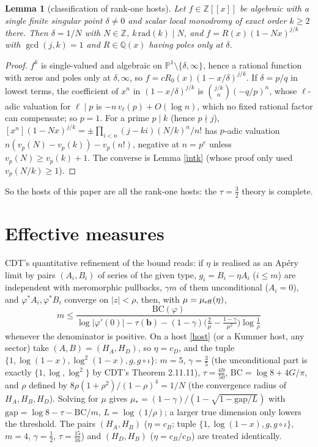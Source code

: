 \documentclass[11pt]{amsart}
\newtheorem{lemma}[theorem]{Lemma}
\theoremstyle{remark}
\newcommand{\Q}{\mathbb Q}\newcommand{\Z}{\mathbb Z}\newcommand{\R}{\mathbb R}\newcommand{\C}{\mathbb C}
\newcommand{\PP}{\mathbb P}\newcommand{\D}{\mathbb D}\newcommand{\T}{\mathbb T}\newcommand{\Cl}{\mathrm{Cl}_2}\newcommand{\Li}{\mathrm{Li}_2}
\begin{document}
\begin{lemma}[classification of rank-one hosts]\label{class}
Let $f\in\Z[[x]]$ be algebraic with a single finite singular point $\delta\ne0$ and scalar local monodromy of exact order $k\ge2$ there. Then $\delta=1/N$ with $N\in\Z$, $k\,\mathrm{rad}(k)\mid N$, and $f=R(x)(1-Nx)^{j/k}$ with $\gcd(j,k)=1$ and $R\in\Q(x)$ having poles only at $\delta$.
\end{lemma}
\begin{proof}
$f^k$ is single-valued and algebraic on $\PP^1\setminus\{\delta,\infty\}$, hence a rational function with zeros and poles only at $\delta,\infty$, so $f=cR_0(x)(1-x/\delta)^{j/k}$. If $\delta=p/q$ in lowest terms, the coefficient of $x^n$ in $(1-x/\delta)^{j/k}$ is $\binom{j/k}n(-q/p)^n$, whose $\ell$-adic valuation for $\ell\mid p$ is $-n\,v_\ell(p)+O(\log n)$, which no fixed rational factor can compensate; so $p=1$. For a prime $p\mid k$ (hence $p\nmid j$), $[x^n](1-Nx)^{j/k}=\pm\prod_{i<n}(j-ki)(N/k)^n/n!$ has $p$-adic valuation $n(v_p(N)-v_p(k))-v_p(n!)$, negative at $n=p^e$ unless $v_p(N)\ge v_p(k)+1$. The converse is Lemma \ref{intk} (whose proof only used $v_p(N/k)\ge1$).
\end{proof}

So the hosts of this paper are all the rank-one hosts: the $\tau=\frac32$ theory is complete.

\section{Effective measures}
CDT's quantitative refinement of the bound \cite[Proposition \texttt{theomainreprise}]{ICM} reads: if $\eta$ is realised as an Ap\'ery limit by pairs $(A_i,B_i)$ of series of the given type, $g_i=B_i-\eta A_i$ ($i\le m$) are independent with meromorphic pullbacks, $\gamma m$ of them unconditional ($A_i=0$), and $\varphi^*A_i,\varphi^*B_i$ converge on $|z|<\rho$, then, with $\mu=\mu_{\rm eff}(\eta)$,
\[
m\le\frac{\mathrm{BC}(\varphi)}{\log|\varphi'(0)|-\tau(\mathbf b)-(1-\gamma)\bigl(\tfrac2\mu-\tfrac{1-\gamma}{\mu^2}\bigr)\log\tfrac1\rho}
\]
whenever the denominator is positive. On a host \eqref{host} (or a Kummer host, any sector) take $(A,B)=(H_A,H_D)$, so $\eta=c_D$, and the tuple $\{1,\log(1-x),\log^2(1-x),g,g\circ\iota\}$: $m=5$, $\gamma=\frac35$ (the unconditional part is exactly $\{1,\log,\log^2\}$ by CDT's Theorem 2.11.11), $\tau=\frac{69}{50}$, $\mathrm{BC}=\log8+4G/\pi$, and $\rho$ defined by $8\rho(1+\rho^2)/(1-\rho)^4=1/N$ (the convergence radius of $H_A,H_B,H_D$). Solving for $\mu$ gives $\mu_*=(1-\gamma)/(1-\sqrt{1-\mathrm{gap}/L})$ with $\mathrm{gap}=\log8-\tau-\mathrm{BC}/m$, $L=\log(1/\rho)$; a larger true dimension only lowers the threshold. The pairs $(H_A,H_B)$ ($\eta=c_B$; tuple $\{1,\log(1-x),g,g\circ\iota\}$, $m=4$, $\gamma=\frac12$, $\tau=\frac{15}{16}$) and $(H_D,H_B)$ ($\eta=c_B/c_D$) are treated identically.
\end{document}
